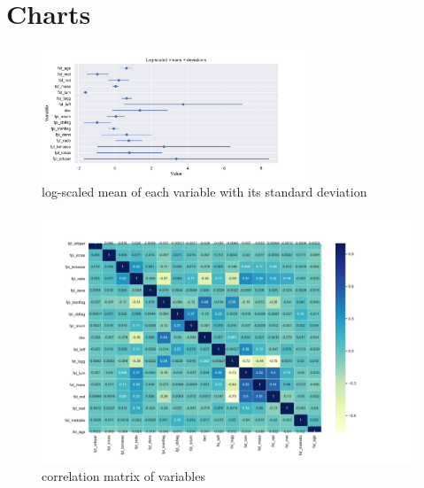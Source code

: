 \documentclass[12p]{article}
\begin{document}
\section{Charts}

\begin{figure}[!ht]
    \caption{log-scaled mean of each variable with its standard deviation}
    \centering
    \includegraphics[angle=90, width=0.7\textwidth]{graphics/mean_deviation.pdf}
\end{figure}

\begin{figure}
    \caption{correlation matrix of variables}
    \includegraphics[angle=90, width=1.3\textwidth]{graphics/correlation_matrix.pdf}
\end{figure}
\end{document}

